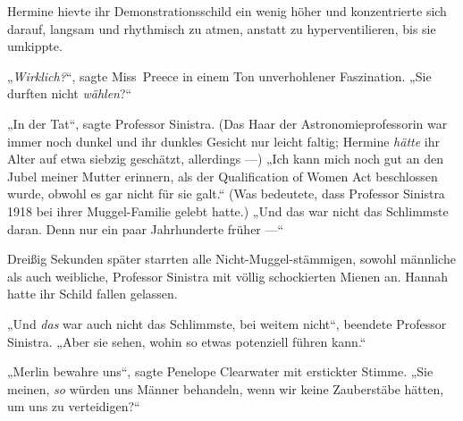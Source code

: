 Hermine hievte ihr Demonstrationsschild ein wenig höher und konzentrierte sich darauf, langsam und rhythmisch zu atmen, anstatt zu hyperventilieren, bis sie umkippte.

„\emph{Wirklich?}“, sagte Miss~Preece in einem Ton unverhohlener Faszination.
„Sie durften nicht \emph{wählen}?“

„In der Tat“, sagte Professor Sinistra. (Das Haar der Astronomieprofessorin war immer noch dunkel und ihr dunkles Gesicht nur leicht faltig; Hermine \emph{hätte} ihr Alter auf etwa siebzig geschätzt, allerdings —)
„Ich kann mich noch gut an den Jubel meiner Mutter erinnern, als der Qualification of Women Act beschlossen wurde, obwohl es gar nicht für sie galt.“ (Was bedeutete, dass Professor Sinistra 1918 bei ihrer Muggel-Familie gelebt hatte.)
„Und das war nicht das Schlimmste daran. Denn nur ein paar Jahrhunderte früher —“

Dreißig Sekunden später starrten alle Nicht-Muggel-stämmigen, sowohl männliche als auch weibliche, Professor Sinistra mit völlig schockierten Mienen an. Hannah hatte ihr Schild fallen gelassen.

„Und \emph{das} war auch nicht das Schlimmste, bei weitem nicht“, beendete Professor Sinistra.
„Aber sie sehen, wohin so etwas potenziell führen kann.“

„Merlin bewahre uns“, sagte Penelope Clearwater mit erstickter Stimme.
„Sie meinen, \emph{so} würden uns Männer behandeln, wenn wir keine Zauberstäbe hätten, um uns zu verteidigen?“

